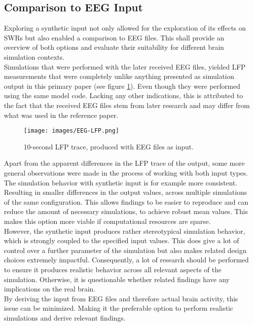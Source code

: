    \subsection{Comparison to EEG Input}
    Exploring a synthetic input not only allowed for the exploration of its effects on SWRs but also enabled a comparison to EEG files. This shall provide an overview of both options and evaluate their suitability for different brain simulation contexts.\\
    Simulations that were performed with the later received EEG files, yielded LFP measurements that were completely unlike anything \textcite{Aussel.2018} presented as simulation output in this primary paper (see figure \ref{fig:EEG-LFP}). Even though they were performed using the same model code. Lacking any other indications, this is attributed to the fact that the received EEG files stem from later research and may differ from what was used in the reference paper.
    \begin{figure}[htbp]
        \centering
        \texttt{[image: images/EEG-LFP.png]}
        \caption{10-second LFP trace, produced with EEG files as input.}
        \label{fig:EEG-LFP}
    \end{figure}
    Apart from the apparent differences in the LFP trace of the output, some more general observations were made in the process of working with both input types. The simulation behavior with synthetic input is for example more consistent. Resulting in smaller differences in the output values, across multiple simulations of the same configuration. This allows findings to be easier to reproduce and can reduce the amount of necessary simulations, to achieve robust mean values. This makes this option more viable if computational resources are sparse.\\
    However, the synthetic input produces rather stereotypical simulation behavior, which is strongly coupled to the specified input values. This does give a lot of control over a further parameter of the simulation but also makes related design choices extremely impactful. Consequently, a lot of research should be performed to ensure it produces realistic behavior across all relevant aspects of the simulation. Otherwise, it is questionable whether related findings have any implications on the real brain.\\ 
    By deriving the input from EEG files and therefore actual brain activity, this issue can be minimized. Making it the preferable option to perform realistic simulations and derive relevant findings. 
    


